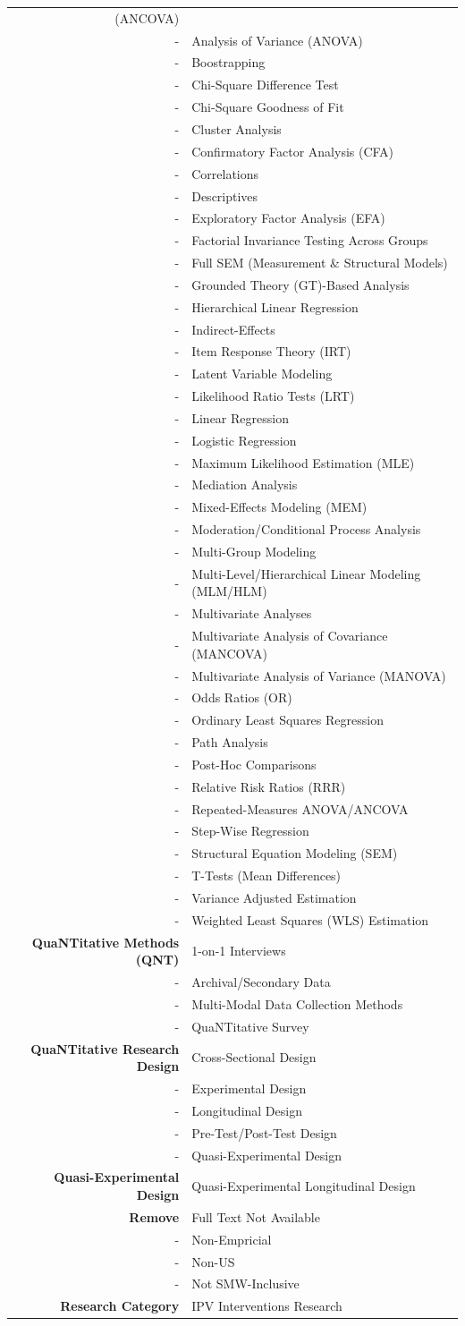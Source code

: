 \documentclass[11pt,]{tufte-book}
\begin{document}
\begin{longtable}[]{@{}rl@{}}
(ANCOVA)\tabularnewline
- & Analysis of Variance (ANOVA)\tabularnewline
- & Boostrapping\tabularnewline
- & Chi-Square Difference Test\tabularnewline
- & Chi-Square Goodness of Fit\tabularnewline
- & Cluster Analysis\tabularnewline
- & Confirmatory Factor Analysis (CFA)\tabularnewline
- & Correlations\tabularnewline
- & Descriptives\tabularnewline
- & Exploratory Factor Analysis (EFA)\tabularnewline
- & Factorial Invariance Testing Across Groups\tabularnewline
- & Full SEM (Measurement \& Structural Models)\tabularnewline
- & Grounded Theory (GT)-Based Analysis\tabularnewline
- & Hierarchical Linear Regression\tabularnewline
- & Indirect-Effects\tabularnewline
- & Item Response Theory (IRT)\tabularnewline
- & Latent Variable Modeling\tabularnewline
- & Likelihood Ratio Tests (LRT)\tabularnewline
- & Linear Regression\tabularnewline
- & Logistic Regression\tabularnewline
- & Maximum Likelihood Estimation (MLE)\tabularnewline
- & Mediation Analysis\tabularnewline
- & Mixed-Effects Modeling (MEM)\tabularnewline
- & Moderation/Conditional Process Analysis\tabularnewline
- & Multi-Group Modeling\tabularnewline
- & Multi-Level/Hierarchical Linear Modeling (MLM/HLM)\tabularnewline
- & Multivariate Analyses\tabularnewline
- & Multivariate Analysis of Covariance (MANCOVA)\tabularnewline
- & Multivariate Analysis of Variance (MANOVA)\tabularnewline
- & Odds Ratios (OR)\tabularnewline
- & Ordinary Least Squares Regression\tabularnewline
- & Path Analysis\tabularnewline
- & Post-Hoc Comparisons\tabularnewline
- & Relative Risk Ratios (RRR)\tabularnewline
- & Repeated-Measures ANOVA/ANCOVA\tabularnewline
- & Step-Wise Regression\tabularnewline
- & Structural Equation Modeling (SEM)\tabularnewline
- & T-Tests (Mean Differences)\tabularnewline
- & Variance Adjusted Estimation\tabularnewline
- & Weighted Least Squares (WLS) Estimation\tabularnewline
\textbf{QuaNTitative Methods (QNT)} & 1-on-1 Interviews\tabularnewline
- & Archival/Secondary Data\tabularnewline
- & Multi-Modal Data Collection Methods\tabularnewline
- & QuaNTitative Survey\tabularnewline
\textbf{QuaNTitative Research Design} & Cross-Sectional
Design\tabularnewline
- & Experimental Design\tabularnewline
- & Longitudinal Design\tabularnewline
- & Pre-Test/Post-Test Design\tabularnewline
- & Quasi-Experimental Design\tabularnewline
\textbf{Quasi-Experimental Design} & Quasi-Experimental Longitudinal
Design\tabularnewline
\textbf{Remove} & Full Text Not Available\tabularnewline
- & Non-Empricial\tabularnewline
- & Non-US\tabularnewline
- & Not SMW-Inclusive\tabularnewline
\textbf{Research Category} & IPV Interventions Research\tabularnewline

\end{longtable}
\end{document}
